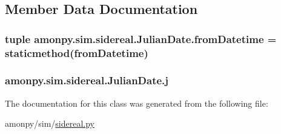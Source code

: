 \subsection{Member Data Documentation}
\hypertarget{classamonpy_1_1sim_1_1sidereal_1_1_julian_date_a8158160571041fe0def786c0ba7908c5}{
\subsubsection[{from\-Datetime}]{\setlength{\rightskip}{0pt plus 5cm}tuple amonpy.\-sim.\-sidereal.\-Julian\-Date.\-from\-Datetime = staticmethod(from\-Datetime)\hspace{0.3cm}{\ttfamily [static]}}}\label{classamonpy_1_1sim_1_1sidereal_1_1_julian_date_a8158160571041fe0def786c0ba7908c5}
\hypertarget{classamonpy_1_1sim_1_1sidereal_1_1_julian_date_a56dfdde7574637024c33565e181e1cc9}{
\subsubsection[{j}]{\setlength{\rightskip}{0pt plus 5cm}amonpy.\-sim.\-sidereal.\-Julian\-Date.\-j}}\label{classamonpy_1_1sim_1_1sidereal_1_1_julian_date_a56dfdde7574637024c33565e181e1cc9}


The documentation for this class was generated from the following file\-:\begin{DoxyCompactItemize}
\item 
amonpy/sim/\hyperlink{sidereal_8py}{sidereal.\-py}\end{DoxyCompactItemize}
